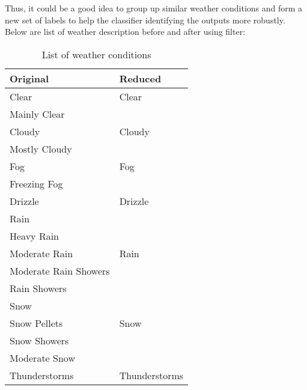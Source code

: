 Thus, it could be a good idea to group up similar weather conditions and form a new set of labels to help the classifier identifying the outputs more robustly. Below are list of weather description before and after using filter:

\begin{table} [h!]
\centering
\caption{List of weather conditions}
\begin{tabular}{l|l} 

\textbf{Original}     &                 \textbf{Reduced}         \\ \hline
Clear                 &                 Clear                    \\
Mainly Clear          &                                          \\ \hline
Cloudy                &                 Cloudy                   \\
Mostly Cloudy         &                                          \\ \hline
Fog                   &                 Fog                      \\ 
Freezing Fog          &                                          \\ \hline
Drizzle               &                 Drizzle                  \\ \hline
Rain                  &                                          \\
Heavy Rain            &                                          \\
Moderate Rain         &                 Rain                     \\ 
Moderate Rain Showers &                                          \\
Rain Showers          &                                          \\ \hline
Snow                  &                                          \\
Snow Pellets          &                 Snow                     \\
Snow Showers          &                                          \\ 
Moderate Snow         &                                          \\ \hline
Thunderstorms         & Thunderstorms                            \\
\end{tabular}
\end{table}

